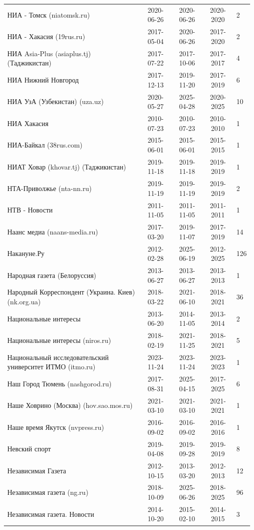 \begin{longtable}{p{6cm}cccp{2cm}}
НИА - Томск (niatomsk.ru) & 2020-06-26 & 2020-06-26 & 2020-2020 & 2\\
НИА - Хакасия (19rus.ru) & 2017-05-04 & 2020-06-26 & 2017-2020 & 2\\
НИА Asia-Plus (asiaplus.tj) (Таджикистан) & 2017-07-22 & 2017-10-06 & 2017-2017 & 4\\
НИА Нижний Новгород & 2017-12-13 & 2019-11-20 & 2017-2019 & 6\\
НИА УзА (Узбекистан) (uza.uz) & 2020-05-27 & 2025-04-28 & 2020-2025 & 10\\
НИА Хакасия & 2010-07-23 & 2010-07-23 & 2010-2010 & 1\\
НИА-Байкал (38rus.com) & 2015-06-01 & 2015-06-01 & 2015-2015 & 1\\
НИАТ Ховар (khovar.tj) (Таджикистан) & 2019-11-18 & 2019-11-18 & 2019-2019 & 1\\
НТА-Приволжье (nta-nn.ru) & 2019-11-19 & 2019-11-19 & 2019-2019 & 2\\
НТВ - Новости & 2011-11-05 & 2011-11-05 & 2011-2011 & 1\\
Наанс медиа (naans-media.ru) & 2017-03-20 & 2019-11-07 & 2017-2019 & 14\\
Накануне.Ру & 2012-02-28 & 2025-06-19 & 2012-2025 & 126\\
Народная газета (Белоруссия) & 2013-06-27 & 2013-06-27 & 2013-2013 & 1\\
Народный Корреспондент (Украина. Киев) (nk.org.ua) & 2018-03-22 & 2021-06-10 & 2018-2021 & 36\\
Национальные интересы & 2013-06-20 & 2014-11-05 & 2013-2014 & 2\\
Национальные интересы (niros.ru) & 2018-02-19 & 2021-11-25 & 2018-2021 & 5\\
Национальный исследовательский университет ИТМО (itmo.ru) & 2023-11-24 & 2023-11-24 & 2023-2023 & 1\\
Наш Город Тюмень (nashgorod.ru) & 2017-08-31 & 2025-04-15 & 2017-2025 & 6\\
Наше Ховрино (Москва) (hov.sao.mos.ru) & 2021-03-10 & 2021-03-10 & 2021-2021 & 1\\
Наше время Якутск (nvpress.ru) & 2016-09-02 & 2016-09-02 & 2016-2016 & 1\\
Невский спорт & 2019-04-08 & 2019-09-28 & 2019-2019 & 8\\
Независимая Газета & 2012-10-15 & 2013-03-20 & 2012-2013 & 12\\
Независимая газета (ng.ru) & 2018-10-09 & 2025-06-26 & 2018-2025 & 96\\
Независимая газета. Новости & 2014-10-20 & 2015-02-10 & 2014-2015 & 3\\

\end{longtable}
